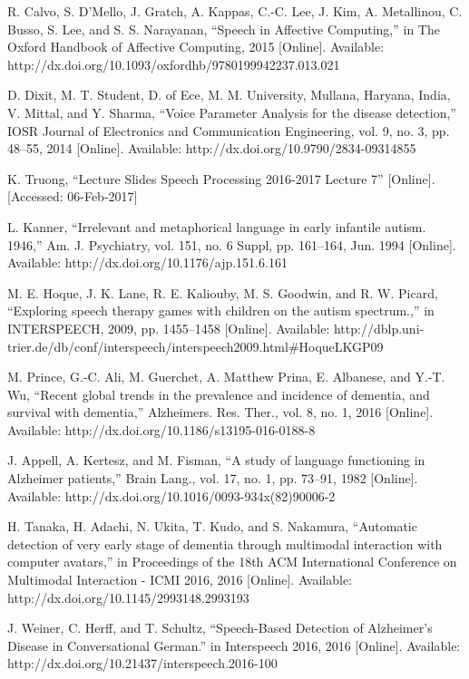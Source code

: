 \documentclass[conference]{IEEEtran}
\begin{document}
\begin{thebibliography}{1}

R. Calvo, S. D’Mello, J. Gratch, A. Kappas, C.-C. Lee, J. Kim, A. Metallinou, C. Busso, S. Lee, and S. S. Narayanan, “Speech in Affective Computing,” in The Oxford Handbook of Affective Computing, 2015 [Online]. Available: http://dx.doi.org/10.1093/oxfordhb/9780199942237.013.021

D. Dixit, M. T. Student, D. of Ece, M. M. University, Mullana, Haryana, India, V. Mittal, and Y. Sharma, “Voice Parameter Analysis for the disease detection,” IOSR Journal of Electronics and Communication Engineering, vol. 9, no. 3, pp. 48–55, 2014 [Online]. Available: http://dx.doi.org/10.9790/2834-09314855

K. Truong, “Lecture Slides Speech Processing 2016-2017 Lecture 7” [Online]. [Accessed: 06-Feb-2017]

L. Kanner, “Irrelevant and metaphorical language in early infantile autism. 1946,” Am. J. Psychiatry, vol. 151, no. 6 Suppl, pp. 161–164, Jun. 1994 [Online]. Available: http://dx.doi.org/10.1176/ajp.151.6.161

M. E. Hoque, J. K. Lane, R. E. Kaliouby, M. S. Goodwin, and R. W. Picard, “Exploring speech therapy games with children on the autism spectrum.,” in INTERSPEECH, 2009, pp. 1455–1458 [Online]. Available: http://dblp.uni-trier.de/db/conf/interspeech/interspeech2009.html\#HoqueLKGP09

M. Prince, G.-C. Ali, M. Guerchet, A. Matthew Prina, E. Albanese, and Y.-T. Wu, “Recent global trends in the prevalence and incidence of dementia, and survival with dementia,” Alzheimers. Res. Ther., vol. 8, no. 1, 2016 [Online]. Available: http://dx.doi.org/10.1186/s13195-016-0188-8

J. Appell, A. Kertesz, and M. Fisman, “A study of language functioning in Alzheimer patients,” Brain Lang., vol. 17, no. 1, pp. 73–91, 1982 [Online]. Available: http://dx.doi.org/10.1016/0093-934x(82)90006-2

H. Tanaka, H. Adachi, N. Ukita, T. Kudo, and S. Nakamura, “Automatic detection of very early stage of dementia through multimodal interaction with computer avatars,” in Proceedings of the 18th ACM International Conference on Multimodal Interaction - ICMI 2016, 2016 [Online]. Available: http://dx.doi.org/10.1145/2993148.2993193

J. Weiner, C. Herff, and T. Schultz, “Speech-Based Detection of Alzheimer’s Disease in Conversational German.” in Interspeech 2016, 2016 [Online]. Available: http://dx.doi.org/10.21437/interspeech.2016-100


\end{thebibliography}
\end{document}
